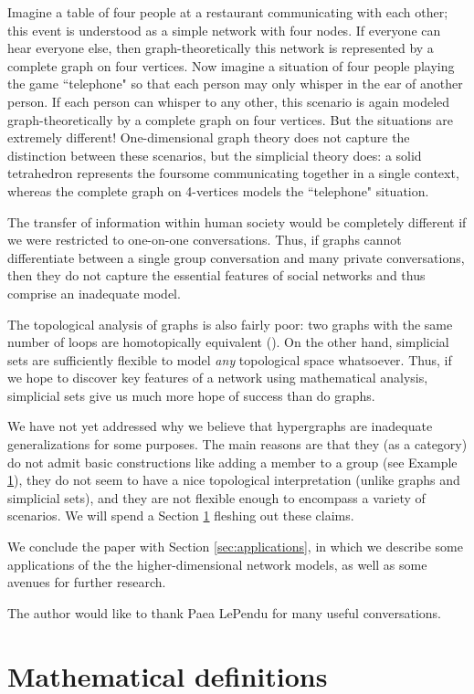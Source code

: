 \documentclass{amsart}
\begin{document}
Imagine a table of four people at a restaurant communicating with each other; this event is understood as a simple network with four nodes.  If everyone can hear everyone else, then graph-theoretically this network is represented by a complete graph on four vertices.  Now imagine a situation of four people playing the game ``telephone" so that each person may only whisper in the ear of another person.  If each person can whisper to any other, this scenario is again modeled graph-theoretically by a complete graph on four vertices.  But the situations are extremely different!  One-dimensional graph theory does not capture the distinction between these scenarios, but the simplicial theory does: a solid tetrahedron represents the foursome communicating together in a single context, whereas the complete graph on 4-vertices models the ``telephone" situation.  

The transfer of information within human society would be completely different if we were restricted to one-on-one conversations.  Thus, if graphs cannot differentiate between a single group conversation and many private conversations, then they do not capture the essential features of social networks and thus comprise an inadequate model.   

The topological analysis of graphs is also fairly poor: two graphs with the same number of loops are homotopically equivalent (\cite{}).  On the other hand, simplicial sets are sufficiently flexible to model {\em any} topological space whatsoever.  Thus, if we hope to discover key features of a network using mathematical analysis, simplicial sets give us much more hope of success than do graphs.

We have not yet addressed why we believe that hypergraphs are inadequate generalizations for some purposes.  The main reasons are that they (as a category) do not admit basic constructions like adding a member to a group (see Example \ref{}), they do not seem to have a nice topological interpretation (unlike graphs and simplicial sets), and they are not flexible enough to encompass a variety of scenarios.  We will spend a Section \ref{} fleshing out these claims.

We conclude the paper with Section \ref{sec:applications}, in which we describe some applications of the the higher-dimensional network models, as well as some avenues for further research.

The author would like to thank Paea LePendu for many useful conversations.

\section{Mathematical definitions}
\end{document}
